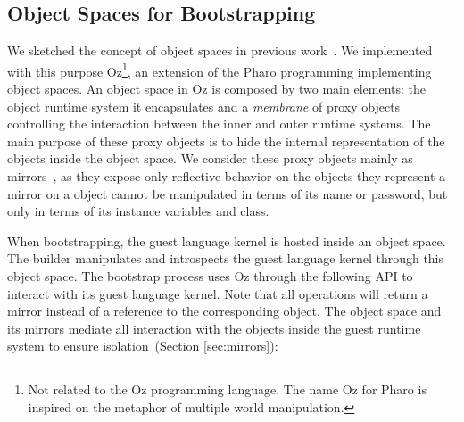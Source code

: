 \subsection{Object Spaces for Bootstrapping}


We sketched the concept of object spaces in previous work~\cite{Poli13a}. We implemented with this purpose Oz\footnote{Not related to the Oz programming language. The name Oz for Pharo is inspired on the metaphor of multiple world manipulation.}, an extension of the Pharo programming implementing object spaces. An object space in Oz is composed by two main elements: the object runtime system it encapsulates and a \emph{membrane} of proxy objects controlling the interaction between the inner and outer runtime systems. The main purpose of these proxy objects is to hide the internal representation of the objects inside the object space. We consider these proxy objects mainly as mirrors~\cite{Brac04b}, as they expose only reflective behavior on the objects they represent \eg a mirror on a  object cannot be manipulated in terms of its name or password, but only in terms of its instance variables and class.

When bootstrapping, the guest language kernel is hosted inside an object space. The builder manipulates and introspects the guest language kernel through this object space. The bootstrap process uses Oz through the following API to interact with its guest language kernel. Note that all operations will return a mirror instead of a reference to the corresponding object. The object space and its mirrors mediate all interaction with the objects inside the guest runtime system to ensure isolation~(Section \ref{sec:mirrors}):

